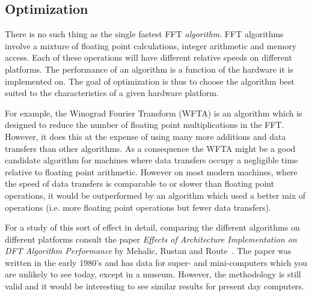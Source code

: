 \documentclass[fleqn,12pt]{article}
\begin{document}



\subsection{Optimization}
%
There is no such thing as the single fastest FFT {\em algorithm}. FFT
algorithms involve a mixture of floating point calculations, integer
arithmetic and memory access. Each of these operations will have
different relative speeds on different platforms.  The performance of
an algorithm is a function of the hardware it is implemented on.  The
goal of optimization is thus to choose the algorithm best suited to
the characteristics of a given hardware platform.

For example, the Winograd Fourier Transform (WFTA) is an algorithm
which is designed to reduce the number of floating point
multiplications in the FFT. However, it does this at the expense of
using many more additions and data transfers than other algorithms.
As a consequence the WFTA might be a good candidate algorithm for
machines where data transfers occupy a negligible time relative to
floating point arithmetic. However on most modern machines, where the
speed of data transfers is comparable to or slower than floating point
operations, it would be outperformed by an algorithm which used a
better mix of operations (i.e. more floating point operations but
fewer data transfers).

For a study of this sort of effect in detail, comparing the different
algorithms on different platforms consult the paper {\it Effects of
Architecture Implementation on DFT Algorithm Performance} by Mehalic,
Rustan and Route~\cite{mehalic85}. The paper was written in the early
1980's and has data for super- and mini-computers which you are
unlikely to see today, except in a museum. However, the methodology is
still valid and it would be interesting to see similar results for
present day computers.
\end{document}
